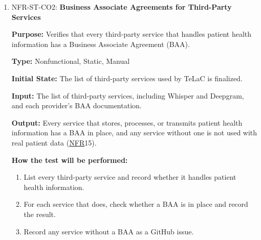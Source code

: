 \documentclass[12pt, titlepage]{article}
\newcommand{\srsnfr}[1]{\href{https://github.com/Nour-Fawaz/MacaBoca/blob/main/pdfs/SRS/SRS.pdf}{NFR}}
\renewcommand{\_}{\oldunderscore\allowbreak}
\begin{document}
\begin{enumerate}
  \item NFR-ST-CO2: \textbf{Business Associate Agreements for Third-Party Services\\}
  \begin{mdframed}[linewidth=0.5mm]
      \textbf{Purpose:} Verifies that every third-party service that handles patient health information has a Business Associate Agreement (BAA). \par
      \textbf{Type:} Nonfunctional, Static, Manual \par
      \textbf{Initial State:} The list of third-party services used by TeLaC is finalized. \par
      \textbf{Input:} The list of third-party services, including Whisper and Deepgram, and each provider's BAA documentation. \par
      \textbf{Output:} Every service that stores, processes, or transmits patient health information has a BAA in place, and any service without one is not used with real patient data (\srsnfr*{15}). \par
      \textbf{How the test will be performed:}
      \begin{enumerate}
      \item[1.] List every third-party service and record whether it handles patient health information.
      \item[2.] For each service that does, check whether a BAA is in place and record the result.
      \item[3.] Record any service without a BAA as a GitHub issue.
      \end{enumerate}
  \end{mdframed}
\end{enumerate}
\end{document}
